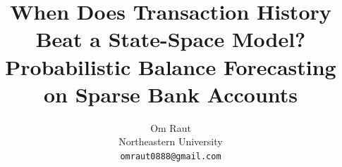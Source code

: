 \documentclass[10pt]{article}
\title{When Does Transaction History Beat a State-Space Model?\\
Probabilistic Balance Forecasting on Sparse Bank Accounts}
\author{Om Raut\\ \small Northeastern University\\ \small\texttt{omraut0888@gmail.com}}
\date{}
\begin{document}
\maketitle
















\renewcommand{\bibfont}{\small\raggedright}



\appendix








\end{document}
